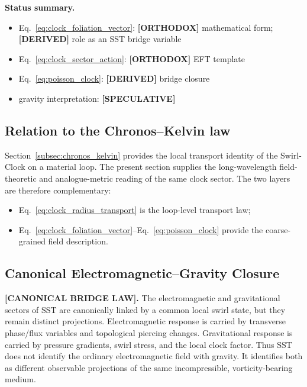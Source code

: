 \documentclass[11pt]{article}
\theoremstyle{definition}
\theoremstyle{plain}
\theoremstyle{remark}
\begin{document}
        \textbf{Status summary.}
        \begin{itemize}
            \item Eq.~\eqref{eq:clock_foliation_vector}: \textbf{[ORTHODOX]} mathematical form; \textbf{[DERIVED]} role as an SST bridge variable
            \item Eq.~\eqref{eq:clock_sector_action}: \textbf{[ORTHODOX]} EFT template
            \item Eq.~\eqref{eq:poisson_clock}: \textbf{[DERIVED]} bridge closure
            \item gravity interpretation: \textbf{[SPECULATIVE]}
        \end{itemize}

    \subsection{Relation to the Chronos--Kelvin law}

        Section~\ref{subsec:chronos_kelvin} provides the local transport identity of the Swirl-Clock on a material loop. The present section supplies the long-wavelength field-theoretic and analogue-metric reading of the same clock sector. The two layers are therefore complementary:

        \begin{itemize}
            \item Eq.~\eqref{eq:clock_radius_transport} is the loop-level transport law;
            \item Eq.~\eqref{eq:clock_foliation_vector}--Eq.~\eqref{eq:poisson_clock} provide the coarse-grained field description.
        \end{itemize}


    \subsection{Canonical Electromagnetic--Gravity Closure}
        \label{subsec:canonical_em_gravity_closure}

        \textbf{[CANONICAL BRIDGE LAW].} The electromagnetic and gravitational sectors of SST are canonically linked by a common local swirl state, but they remain distinct projections. Electromagnetic response is carried by transverse phase/flux variables and topological piercing changes. Gravitational response is carried by pressure gradients, swirl stress, and the local clock factor. Thus SST does not identify the ordinary electromagnetic field with gravity. It identifies both as different observable projections of the same incompressible, vorticity-bearing medium.
\end{document}

